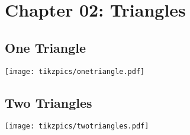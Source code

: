 \documentclass[../main.tex]{subfiles}
\begin{document}
\section{Chapter 02: Triangles}

\subsection{One Triangle}

\texttt{[image: tikzpics/onetriangle.pdf]}

\subsection{Two Triangles}

\texttt{[image: tikzpics/twotriangles.pdf]}
\end{document}
